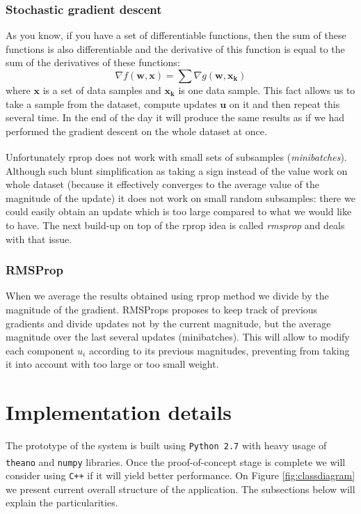 \documentclass[a4paper,12pt]{article}
\begin{document}
\subsubsection{Stochastic gradient descent}
As you know, if you have a set of differentiable functions, then the sum of these functions is also differentiable and the derivative of this function is equal to the sum of the derivatives of these functions:
$$\nabla f(\mathbf{w}, \mathbf{x}) = \displaystyle\sum\nabla g(\mathbf{w}, \mathbf{x_k})$$
where $\mathbf{x}$ is a set of data samples and $\mathbf{x_k}$ is one data sample. This fact allows us to take a sample from the dataset, compute updates $\mathbf{u}$ on it and then repeat this several time. In the end of the day it will produce the same results as if we had performed the gradient descent on the whole dataset at once.

Unfortunately rprop does not work with small sets of subsamples\textsuperscript{\cite{tieleman2012lecture}} (\emph{minibatches}). Although such blunt simplification as taking a sign instead of the value work on whole dataset (because it effectively converges to the average value of the magnitude of the update) it does not work on small random subsamples: there we could easily obtain an update which is too large compared to what we would like to have. The next build-up on top of the rprop idea is called \emph{rmsprop} and deals with that issue.

\subsubsection{RMSProp}
When we average the results obtained using rprop method we divide by the magnitude of the gradient. RMSProps proposes to keep track of previous gradients and divide updates not by the current magnitude, but the average magnitude over the last several updates (minibatches). This will allow to modify each component $u_i$ according to its previous magnitudes, preventing from taking it into account with too large or too small weight.


%
%
\pagebreak
\section{Implementation details}
The prototype of the system is built using \texttt{Python 2.7} with heavy usage of \texttt{theano}\textsuperscript{\cite{bergstra2010theano}} and \texttt{numpy}\textsuperscript{\cite{oliphant2007python}} libraries. Once the proof-of-concept stage is complete we will consider using \texttt{C++} if it will yield better performance. On Figure \ref{fig:classdiagram} we present current overall structure of the application. The subsections below will explain the particularities.
\end{document}
